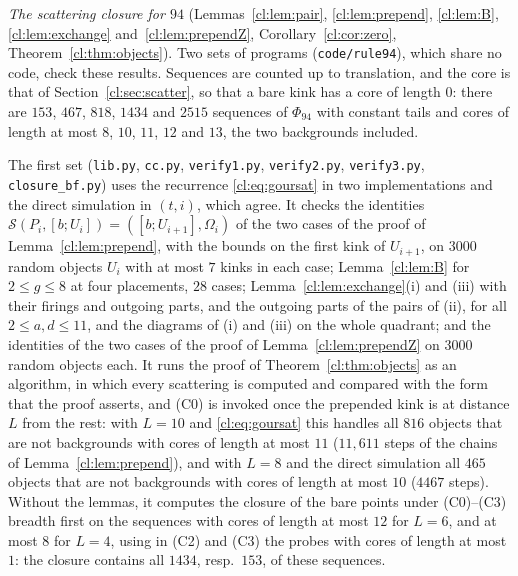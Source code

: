 \emph{The scattering closure for $94$} (Lemmas~\ref{cl:lem:pair}, \ref{cl:lem:prepend}, \ref{cl:lem:B}, \ref{cl:lem:exchange} and~\ref{cl:lem:prependZ}, Corollary~\ref{cl:cor:zero}, Theorem~\ref{cl:thm:objects}). Two sets of programs (\texttt{code/rule94}), which share no code, check these results. Sequences are counted up to translation, and the core is that of Section~\ref{cl:sec:scatter}, so that a bare kink has a core of length $0$: there are $153$, $467$, $818$, $1434$ and $2515$ sequences of $\Phi_{94}$ with constant tails and cores of length at most $8$, $10$, $11$, $12$ and $13$, the two backgrounds included.

The first set (\texttt{lib.py}, \texttt{cc.py}, \texttt{verify1.py}, \texttt{verify2.py}, \texttt{verify3.py}, \texttt{closure\_bf.py}) uses the recurrence \eqref{cl:eq:goursat} in two implementations and the direct simulation in $(t,i)$, which agree. It checks the identities $\mathcal S(P_i,[b;U_i])=([b;U_{i+1}],\Omega_i)$ of the two cases of the proof of Lemma~\ref{cl:lem:prepend}, with the bounds on the first kink of $U_{i+1}$, on $3000$ random objects $U_i$ with at most $7$ kinks in each case; Lemma~\ref{cl:lem:B} for $2\le g\le8$ at four placements, $28$ cases; Lemma~\ref{cl:lem:exchange}(i) and (iii) with their firings and outgoing parts, and the outgoing parts of the pairs of (ii), for all $2\le a,d\le11$, and the diagrams of (i) and (iii) on the whole quadrant; and the identities of the two cases of the proof of Lemma~\ref{cl:lem:prependZ} on $3000$ random objects each. It runs the proof of Theorem~\ref{cl:thm:objects} as an algorithm, in which every scattering is computed and compared with the form that the proof asserts, and (C0) is invoked once the prepended kink is at distance $L$ from the rest: with $L=10$ and \eqref{cl:eq:goursat} this handles all $816$ objects that are not backgrounds with cores of length at most $11$ ($11{,}611$ steps of the chains of Lemma~\ref{cl:lem:prepend}), and with $L=8$ and the direct simulation all $465$ objects that are not backgrounds with cores of length at most $10$ ($4467$ steps). Without the lemmas, it computes the closure of the bare points under (C0)--(C3) breadth first on the sequences with cores of length at most $12$ for $L=6$, and at most $8$ for $L=4$, using in (C2) and (C3) the probes with cores of length at most $1$: the closure contains all $1434$, resp.\ $153$, of these sequences.


